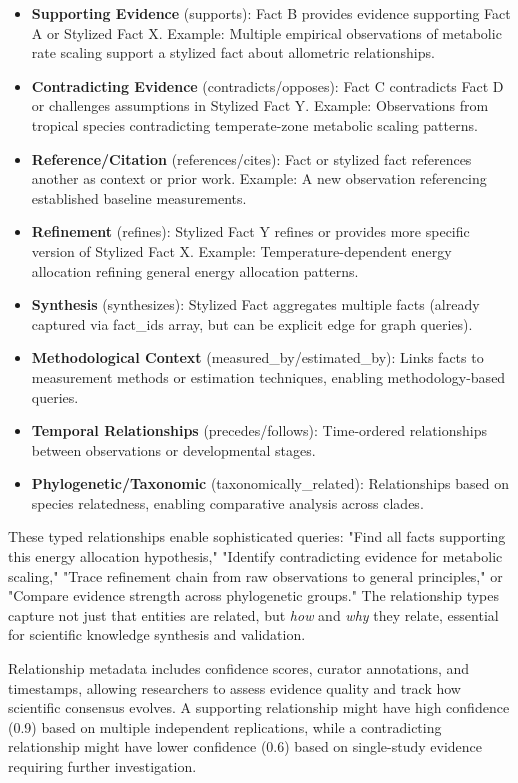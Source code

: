 \documentclass[12pt,a4paper]{article}
\begin{document}
\begin{itemize}[leftmargin=*]
    \item \textbf{Supporting Evidence} (supports): Fact B provides evidence supporting Fact A or Stylized Fact X. Example: Multiple empirical observations of metabolic rate scaling support a stylized fact about allometric relationships.
    \item \textbf{Contradicting Evidence} (contradicts/opposes): Fact C contradicts Fact D or challenges assumptions in Stylized Fact Y. Example: Observations from tropical species contradicting temperate-zone metabolic scaling patterns.
    \item \textbf{Reference/Citation} (references/cites): Fact or stylized fact references another as context or prior work. Example: A new observation referencing established baseline measurements.
    \item \textbf{Refinement} (refines): Stylized Fact Y refines or provides more specific version of Stylized Fact X. Example: Temperature-dependent energy allocation refining general energy allocation patterns.
    \item \textbf{Synthesis} (synthesizes): Stylized Fact aggregates multiple facts (already captured via fact\_ids array, but can be explicit edge for graph queries).
    \item \textbf{Methodological Context} (measured\_by/estimated\_by): Links facts to measurement methods or estimation techniques, enabling methodology-based queries.
    \item \textbf{Temporal Relationships} (precedes/follows): Time-ordered relationships between observations or developmental stages.
    \item \textbf{Phylogenetic/Taxonomic} (taxonomically\_related): Relationships based on species relatedness, enabling comparative analysis across clades.
\end{itemize}

These typed relationships enable sophisticated queries: "Find all facts supporting this energy allocation hypothesis," "Identify contradicting evidence for metabolic scaling," "Trace refinement chain from raw observations to general principles," or "Compare evidence strength across phylogenetic groups." The relationship types capture not just that entities are related, but \textit{how} and \textit{why} they relate, essential for scientific knowledge synthesis and validation.

Relationship metadata includes confidence scores, curator annotations, and timestamps, allowing researchers to assess evidence quality and track how scientific consensus evolves. A supporting relationship might have high confidence (0.9) based on multiple independent replications, while a contradicting relationship might have lower confidence (0.6) based on single-study evidence requiring further investigation.
\end{document}
